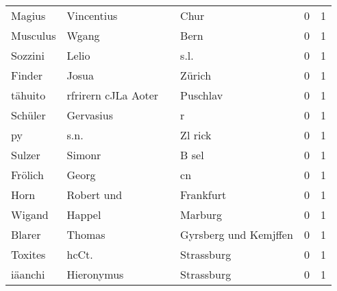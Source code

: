 \begin{tabular}{llllrr}
                   Magius &                         Vincentius &             &                                        Chur &          0 &         1 \\
                 Musculus &                              Wgang &             &                                        Bern &          0 &         1 \\
                  Sozzini &                              Lelio &             &                                        s.l. &          0 &         1 \\
                   Finder &                              Josua &             &                                      Zürich &          0 &         1 \\
                  tähuito &                rfrirern cJLa Aoter &             &                                    Puschlav &          0 &         1 \\
                  Schüler &                          Gervasius &             &                                           r &          0 &         1 \\
                       py &                               s.n. &             &                                     Zl rick &          0 &         1 \\
                   Sulzer &                             Simonr &             &                                       B sel &          0 &         1 \\
                  Frölich &                              Georg &             &                                          cn &          0 &         1 \\
                     Horn &                         Robert und &             &                                   Frankfurt &          0 &         1 \\
                   Wigand &                             Happel &             &                                     Marburg &          0 &         1 \\
                   Blarer &                             Thomas &             &                       Gyrsberg und Kemjffen &          0 &         1 \\
                  Toxites &                              hcCt. &             &                                  Strassburg &          0 &         1 \\
                  iäanchi &                         Hieronymus &             &                                  Strassburg &          0 &         1 \\

\end{tabular}
